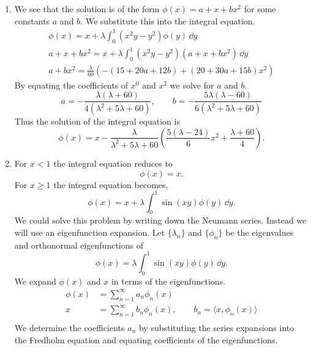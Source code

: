 \begin{Solution}
  \begin{enumerate}
  \item
    We see that the solution is of the form $\phi(x) = a + x + b x^2$ for some 
    constants $a$ and $b$.  We substitute this into the integral equation.
    \begin{gather*}
      \phi(x) = x + \lambda \int_0^1 \left( x^2 y - y^2 \right) \phi(y) \,\dd y \\
      a + x + b x^2 = x + \lambda \int_0^1 \left( x^2 y - y^2 \right) 
      (a + x + b x^2)\,\dd y \\
      a + b x^2 = \frac{\lambda}{60} \left( - (15 + 20 a + 12 b) + 
        (20 + 30 a + 15 b) x^2 \right)
    \end{gather*}
    By equating the coefficients of $x^0$ and $x^2$ we solve for $a$ and $b$.
    \[
    a = - \frac{ \lambda (\lambda + 60) }{ 4 (\lambda^2 + 5 \lambda + 60 ) }, 
    \qquad
    b = - \frac{ 5 \lambda (\lambda - 60) }{ 6 (\lambda^2 + 5 \lambda + 60 ) } 
    \]
    Thus the solution of the integral equation is
    \[
    \boxed{
      \phi(x) = x - \frac{ \lambda }{ \lambda^2 + 5 \lambda + 60 }
      \left( \frac{ 5 ( \lambda - 24 ) }{ 6 } x^2 + \frac{ \lambda + 60 }{4}
      \right).
      }
    \]
  \item
    For $x < 1$ the integral equation reduces to
    \[
    \boxed{
      \phi(x) = x.
      }
    \]
    For $x \geq 1$ the integral equation becomes,
    \[
    \phi(x) = x + \lambda \int_0^1 \sin(x y) \phi(y) \,\dd y.
    \]
    We could solve this problem by writing down the Neumann series.  
    Instead we will use an eigenfunction expansion.
    Let $\{ \lambda_n \}$ and $\{ \phi_n \}$ be the eigenvalues and orthonormal 
    eigenfunctions of 
    \[
    \phi(x) = \lambda \int_0^1 \sin(x y) \phi(y) \,\dd y.
    \]
    We expand $\phi(x)$ and $x$ in terms of the eigenfunctions.
    \begin{align*}
      \phi(x) &= \sum_{n = 1}^\infty a_n \phi_n(x) \\
      x &= \sum_{n = 1}^\infty b_n \phi_n(x), \qquad b_n = \langle x, \phi_n(x) \rangle \\
    \end{align*}
    We determine the coefficients $a_n$ by substituting the series expansions
    into the Fredholm equation and equating coefficients of the eigenfunctions.

\end{enumerate}
\end{Solution}

